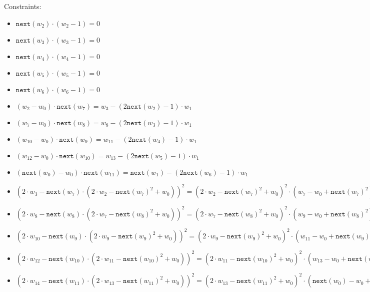 Constraints:
\begin{itemize}
    \item $\texttt{next}(w_2) \cdot (w_2 - 1) = 0$
    \item $\texttt{next}(w_3) \cdot (w_3 - 1) = 0$
    \item $\texttt{next}(w_4) \cdot (w_4 - 1) = 0$
    \item $\texttt{next}(w_5) \cdot (w_5 - 1) = 0$
    \item $\texttt{next}(w_6) \cdot (w_6 - 1) = 0$ \\

    \item $(w_{2} - w_{0}) \cdot \texttt{next}(w_7) = w_3 - (2\texttt{next}(w_{2}) - 1) \cdot w_1$
    \item $(w_{7} - w_{0}) \cdot \texttt{next}(w_8) = w_8 - (2\texttt{next}(w_{3}) - 1) \cdot w_1$
    \item $(w_{10} - w_{0}) \cdot \texttt{next}(w_9) = w_{11} - (2\texttt{next}(w_{4}) - 1) \cdot w_1$
    \item $(w_{12} - w_{0}) \cdot \texttt{next}(w_{10}) = w_{13} - (2\texttt{next}(w_{5}) - 1) \cdot w_1$
    \item $(\texttt{next}(w_{0}) - w_{0}) \cdot \texttt{next}(w_{11}) = \texttt{next}(w_1) - (2\texttt{next}(w_{6}) - 1) \cdot w_1$ \\
    
    
    \item $(2\cdot w_{3} - \texttt{next}(w_7) \cdot (2 \cdot w_2 - \texttt{next}(w_7)^2 + w_{0}))^2 =  (2 \cdot w_2 - \texttt{next}(w_7)^2 + w_{0})^2 \cdot (w_7 - w_0 + \texttt{next}(w_7)^2)$
    \item $(2\cdot w_{8} - \texttt{next}(w_8) \cdot (2 \cdot w_7 - \texttt{next}(w_8)^2 + w_{0}))^2 =  (2 \cdot w_7 - \texttt{next}(w_8)^2 + w_{0})^2 \cdot (w_9 - w_0 + \texttt{next}(w_8)^2)$
    \item $(2\cdot w_{10} - \texttt{next}(w_9) \cdot (2 \cdot w_9 - \texttt{next}(w_9)^2 + w_{0}))^2 =  (2 \cdot w_9 - \texttt{next}(w_9)^2 + w_{0})^2 \cdot (w_{11} - w_0 + \texttt{next}(w_9)^2)$
    \item $(2\cdot w_{12} - \texttt{next}(w_{10}) \cdot (2 \cdot w_{11} - \texttt{next}(w_{10})^2 + w_{0}))^2 =  (2 \cdot w_{11} - \texttt{next}(w_{10})^2 + w_{0})^2 \cdot (w_{13} - w_0 + \texttt{next}(w_{10})^2)$
    \item $(2\cdot w_{14} - \texttt{next}(w_{11}) \cdot (2 \cdot w_{13} - \texttt{next}(w_{11})^2 + w_{0}))^2 =  (2 \cdot w_{13} - \texttt{next}(w_{11})^2 + w_{0})^2 \cdot (\texttt{next}(w_0) - w_0 + \texttt{next}(w_{11})^2)$ \\
    

\end{itemize}
